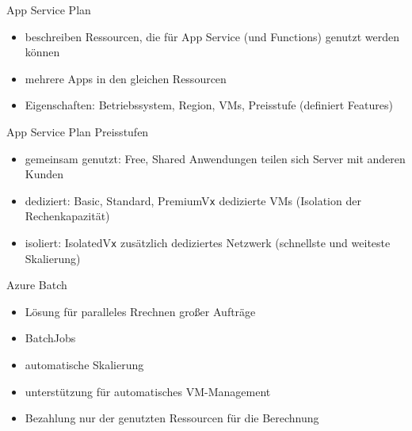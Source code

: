\begin{flashcard}[]{App Service Plan}
  \begin{itemize}
    \item beschreiben Ressourcen, die für App Service (und Functions) genutzt werden können
    \item mehrere Apps in den gleichen Ressourcen
    \item Eigenschaften: Betriebssystem, Region, VMs, Preisstufe (definiert Features)
  \end{itemize}
\end{flashcard}

\begin{flashcard}[]{App Service Plan Preisstufen}
  \begin{itemize}
    \item gemeinsam genutzt: Free, Shared\newline
      Anwendungen teilen sich Server mit anderen Kunden
    \item dediziert: Basic, Standard, PremiumV\texttt{x}\newline
      dedizierte VMs (Isolation der Rechenkapazität)
    \item isoliert: IsolatedV\texttt{x}\newline
      zusätzlich dediziertes Netzwerk (schnellste und weiteste Skalierung)
  \end{itemize}
\end{flashcard}

\begin{flashcard}[]{Azure Batch}
  \begin{itemize}
    \item Lösung für paralleles Rrechnen großer Aufträge
    \item BatchJobs
    \item automatische Skalierung
    \item unterstützung für automatisches VM-Management
    \item Bezahlung nur der genutzten Ressourcen für die Berechnung
  \end{itemize}
\end{flashcard}

